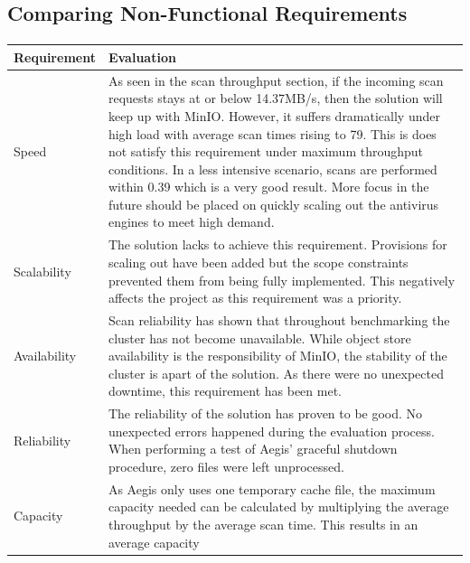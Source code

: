 \documentclass[12pt, conference, final, a4paper, onecolumn, compsoc]{IEEEtran}
\begin{document}
\subsection{Comparing Non-Functional Requirements}
\paragraph{}

\begin{table}[H]
  \centering
  \begin{tabular}{|p{}|p{}|}
    \hline
    \textbf{Requirement} & \textbf{Evaluation} \\ \hline
    Speed & As seen in the scan throughput section, if the incoming scan
            requests stays at or below 14.37MB/s, then the solution will keep up
    with MinIO. However, it suffers dramatically under high load with average
            scan times rising to 79. This is does not satisfy this requirement
            under maximum throughput conditions. In a less intensive
            scenario, scans are performed within 0.39 which is a very good
            result. More focus in the future should be placed on quickly scaling
    out the antivirus engines to meet high demand.\\ \hline
    Scalability & The solution lacks to achieve this requirement. Provisions for
          scaling out have been added but the scope constraints prevented them
                  from being fully implemented. This negatively affects the
                  project as this requirement was a priority. & \\ \hline
    Availability & Scan reliability has shown that throughout benchmarking the
                   cluster has not become unavailable. While object store
                   availability is the responsibility of MinIO, the stability of
    the cluster is apart of the solution. As there were no unexpected downtime,
                   this requirement has been met. \\ \hline
    Reliability & The reliability of the solution has proven to be good. No
                  unexpected errors happened during the evaluation process. When
    performing a test of Aegis' graceful shutdown procedure, zero files were
                  left unprocessed.\\ \hline
    Capacity & As Aegis only uses one temporary cache file, the maximum capacity
               needed can be calculated by multiplying the average throughput by
               the average scan time. This results in an average capacity

\end{tabular}
\end{table}
\end{document}
